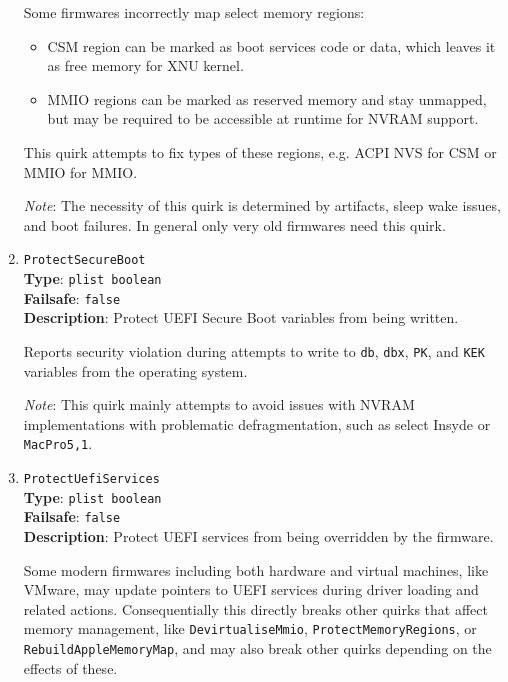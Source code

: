 \documentclass[]{article}
\providecommand{\tightlist}{%
  \setlength{\itemsep}{0pt}\setlength{\parskip}{0pt}}
\begin{document}
\begin{enumerate}
  Some firmwares incorrectly map select memory regions:

  \begin{itemize}
    \tightlist
    \item CSM region can be marked as boot services code or data, which
      leaves it as free memory for XNU kernel.
    \item MMIO regions can be marked as reserved memory and stay unmapped,
      but may be required to be accessible at runtime for NVRAM support.
  \end{itemize}

  This quirk attempts to fix types of these regions, e.g. ACPI NVS for
  CSM or MMIO for MMIO.

  \emph{Note}: The necessity of this quirk is determined by artifacts, sleep
  wake issues, and boot failures. In general only very old firmwares need
  this quirk.

\item
  \texttt{ProtectSecureBoot}\\
  \textbf{Type}: \texttt{plist\ boolean}\\
  \textbf{Failsafe}: \texttt{false}\\
  \textbf{Description}: Protect UEFI Secure Boot variables from being written.

  Reports security violation during attempts to write to \texttt{db}, \texttt{dbx},
  \texttt{PK}, and \texttt{KEK} variables from the operating system.

  \emph{Note}: This quirk mainly attempts to avoid issues with NVRAM implementations
  with problematic defragmentation, such as select Insyde or \texttt{MacPro5,1}.

\item
  \texttt{ProtectUefiServices}\\
  \textbf{Type}: \texttt{plist\ boolean}\\
  \textbf{Failsafe}: \texttt{false}\\
  \textbf{Description}: Protect UEFI services from being overridden by the firmware.

  Some modern firmwares including both hardware and virtual machines, like VMware,
  may update pointers to UEFI services during driver loading and related actions.
  Consequentially this directly breaks other quirks that affect memory management,
  like \texttt{DevirtualiseMmio}, \texttt{ProtectMemoryRegions}, or \texttt{RebuildAppleMemoryMap},
  and may also break other quirks depending on the effects of these.


\end{enumerate}
\end{document}
